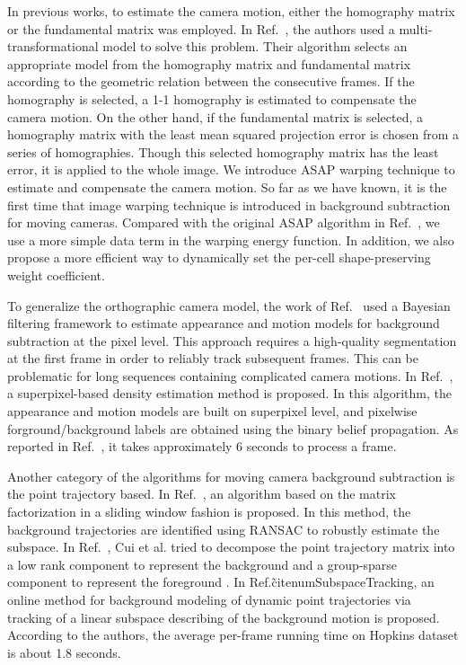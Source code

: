 In previous works, to estimate the camera motion, either the homography matrix or the fundamental matrix was employed. In Ref.~, the authors used a multi-transformational model to solve this problem. Their algorithm selects an appropriate model from the homography matrix and fundamental matrix according to the geometric relation between the consecutive frames. If the homography is selected, a 1-1 homography is estimated to compensate the camera motion. On the other hand, if the fundamental matrix is selected, a homography matrix with the least mean squared projection error is chosen from a series of homographies. Though this selected homography matrix has the least error, it is applied to the whole image. We introduce ASAP warping technique \cite{Liu2009ASAP,Liu_2013ASAP} to estimate and compensate the camera motion. So far as we have known, it is the first time that image warping technique is introduced in background subtraction for moving cameras. Compared with the original ASAP algorithm in Ref.~, we use a more simple data term in the warping energy function. In addition, we also propose a more efficient way to dynamically set the per-cell shape-preserving weight coefficient. \par

To generalize the orthographic camera model, the work of Ref.~ used a Bayesian filtering framework to estimate appearance and motion models for background subtraction at the pixel level. This approach requires a high-quality segmentation at the first frame in order to reliably track subsequent frames. This can be problematic for long sequences containing complicated camera motions. In Ref.~, a superpixel-based density estimation method is proposed. In this algorithm, the appearance and motion models are built on superpixel level, and pixelwise forground/background labels are obtained using the binary belief propagation. As reported in Ref.~, it takes approximately 6 seconds to process a frame.\par

Another category of the algorithms for moving camera background subtraction is the point trajectory based. In Ref.~, an algorithm based on the matrix factorization in a sliding window fashion is proposed. In this method, the background trajectories are identified using RANSAC to robustly estimate the subspace. In Ref.~, Cui et al. tried to decompose the point trajectory matrix into a low rank component to represent the background and a group-sparse component to represent the foreground . In Ref.\~citenum{SubspaceTracking}, an online method for background modeling of dynamic point trajectories via tracking of a linear subspace describing of the background motion is proposed. According to the authors, the average per-frame running time on Hopkins dataset \cite{HopKinsDataSet} is about 1.8 seconds.\par
